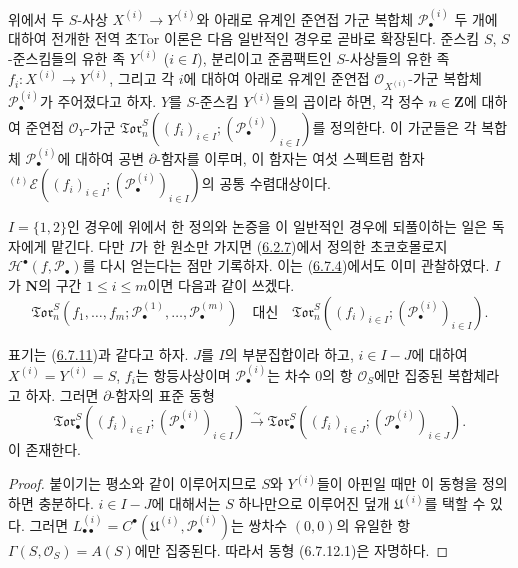 \begin{env}[6.7.11]
\label{III.6.7.11-fr}
위에서 두 $S$-사상 $X^{(i)}\to Y^{(i)}$와 아래로 유계인 준연접
가군 복합체 $\mathscr P_\bullet^{(i)}$ 두 개에 대하여 전개한 전역
초Tor 이론은 다음 일반적인 경우로 곧바로 확장된다. 준스킴 $S$,
$S$-준스킴들의 유한 족 $Y^{(i)}$ ($i\in I$), 분리이고 준콤팩트인
$S$-사상들의 유한 족
$f_i:X^{(i)}\to Y^{(i)}$, 그리고 각 $i$에 대하여 아래로 유계인
준연접 $\mathscr O_{X^{(i)}}$-가군 복합체
$\mathscr P_\bullet^{(i)}$가 주어졌다고 하자. $Y$를 $S$-준스킴
$Y^{(i)}$들의 곱이라 하면, 각 정수 $n\in\mathbf Z$에 대하여 준연접
$\mathscr O_Y$-가군
$\mathfrak{Tor}_n^S((f_i)_{i\in I};
(\mathscr P_\bullet^{(i)})_{i\in I})$를 정의한다. 이 가군들은 각
복합체 $\mathscr P_\bullet^{(i)}$에 대하여 공변
$\partial$-함자를 이루며, 이 함자는 여섯 스펙트럼 함자
$ {}^{(t)}\mathscr E((f_i)_{i\in I};
(\mathscr P_\bullet^{(i)})_{i\in I})$의 공통 수렴대상이다.

$I=\{1,2\}$인 경우에 위에서 한 정의와 논증을 이 일반적인 경우에
되풀이하는 일은 독자에게 맡긴다. 다만 $I$가 한 원소만 가지면
(\hyperref[III.6.2.7-fr]{6.2.7})에서 정의한 초코호몰로지
$\mathscr H^\bullet(f,\mathscr P_\bullet)$를 다시 얻는다는 점만
기록하자. 이는 (\hyperref[III.6.7.4-fr]{6.7.4})에서도 이미
관찰하였다. $I$가 $\mathbf N$의 구간 $1\leq i\leq m$이면 다음과
같이 쓰겠다.
\[
  \mathfrak{Tor}_n^S
  (f_1,\ldots,f_m;
   \mathscr P_\bullet^{(1)},\ldots,\mathscr P_\bullet^{(m)})
  \quad\text{대신}\quad
  \mathfrak{Tor}_n^S
  ((f_i)_{i\in I};(\mathscr P_\bullet^{(i)})_{i\in I}).
\]
\end{env}

\begin{proposition}[6.7.12]
\label{III.6.7.12-fr}
표기는 (\hyperref[III.6.7.11-fr]{6.7.11})과 같다고 하자. $J$를
$I$의 부분집합이라 하고, $i\in I-J$에 대하여
$X^{(i)}=Y^{(i)}=S$, $f_i$는 항등사상이며
$\mathscr P_\bullet^{(i)}$는 차수 $0$의 항
$\mathscr O_S$에만 집중된 복합체라고 하자. 그러면
$\partial$-함자의 표준 동형
\[
  \mathfrak{Tor}_\bullet^S
  ((f_i)_{i\in I};(\mathscr P_\bullet^{(i)})_{i\in I})
  \xrightarrow{\sim}
  \mathfrak{Tor}_\bullet^S
  ((f_i)_{i\in J};(\mathscr P_\bullet^{(i)})_{i\in J}).
  \tag{6.7.12.1}\label{III.6.7.12.1.fr}
\]
이 존재한다.
\end{proposition}

\begin{proof}
붙이기는 평소와 같이 이루어지므로 $S$와 $Y^{(i)}$들이 아핀일 때만
이 동형을 정의하면 충분하다. $i\in I-J$에 대해서는 $S$ 하나만으로
이루어진 덮개 $\mathfrak U^{(i)}$를 택할 수 있다. 그러면
$L_{\bullet\bullet}^{(i)}
=C^\bullet(\mathfrak U^{(i)},\mathscr P_\bullet^{(i)})$는 쌍차수
$(0,0)$의 유일한 항
$\Gamma(S,\mathscr O_S)=A(S)$에만 집중된다. 따라서 동형
(6.7.12.1)은 자명하다.
\end{proof}


